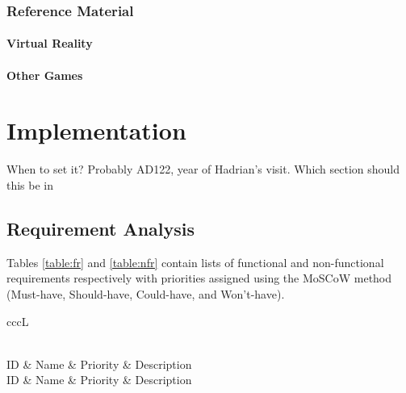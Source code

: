 \documentclass[12pt, a4paper]{report}
\begin{document}
\subsection{Reference Material}

\subsubsection{Virtual Reality}


\subsubsection{Other Games}

\chapter{Implementation}

\todo
{When to set it? Probably AD122, year of Hadrian's visit. Which section should
this be in}

\section{Requirement Analysis}

Tables \ref{table:fr} and \ref{table:nfr} contain lists of functional and
non-functional requirements respectively with priorities assigned using the
MoSCoW method (Must-have, Should-have, Could-have, and Won't-have).

\newcommand{\header}{\toprule{}ID & Name & Priority & Description \\\midrule}
\newcommand{\reqtype}{FR}
\newcommand{\requirement}[3]
{\reqtype\stepcounter{reqindex}\arabic{reqindex} & #1 & #2 & #3 \\}

\begin{xltabular}{\textwidth}{cccL}
  \caption{\label{table:fr}Functional requirements}\\
  \header\endfirsthead
  \header\endhead

  \bottomrule
\end{xltabular}
\end{document}
